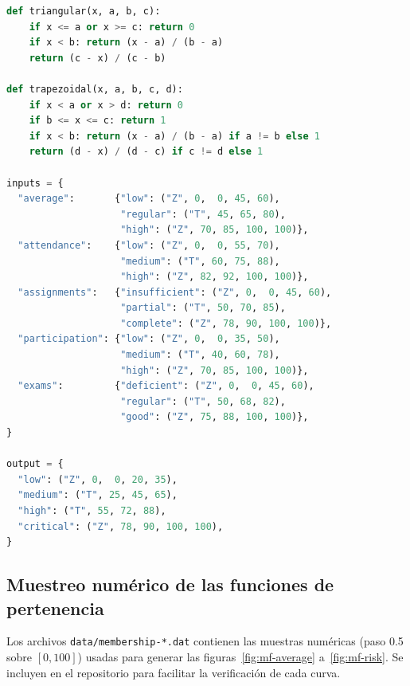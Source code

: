 \begin{lstlisting}[caption={Definicion equivalente del sistema en pseudo-Python},language=Python]
def triangular(x, a, b, c):
    if x <= a or x >= c: return 0
    if x < b: return (x - a) / (b - a)
    return (c - x) / (c - b)

def trapezoidal(x, a, b, c, d):
    if x < a or x > d: return 0
    if b <= x <= c: return 1
    if x < b: return (x - a) / (b - a) if a != b else 1
    return (d - x) / (d - c) if c != d else 1

inputs = {
  "average":       {"low": ("Z", 0,  0, 45, 60),
                    "regular": ("T", 45, 65, 80),
                    "high": ("Z", 70, 85, 100, 100)},
  "attendance":    {"low": ("Z", 0,  0, 55, 70),
                    "medium": ("T", 60, 75, 88),
                    "high": ("Z", 82, 92, 100, 100)},
  "assignments":   {"insufficient": ("Z", 0,  0, 45, 60),
                    "partial": ("T", 50, 70, 85),
                    "complete": ("Z", 78, 90, 100, 100)},
  "participation": {"low": ("Z", 0,  0, 35, 50),
                    "medium": ("T", 40, 60, 78),
                    "high": ("Z", 70, 85, 100, 100)},
  "exams":         {"deficient": ("Z", 0,  0, 45, 60),
                    "regular": ("T", 50, 68, 82),
                    "good": ("Z", 75, 88, 100, 100)},
}

output = {
  "low": ("Z", 0,  0, 20, 35),
  "medium": ("T", 25, 45, 65),
  "high": ("T", 55, 72, 88),
  "critical": ("Z", 78, 90, 100, 100),
}
\end{lstlisting}

\subsection{Muestreo numérico de las funciones de pertenencia}

Los archivos \texttt{data/membership-*.dat} contienen las muestras numéricas (paso 0.5 sobre $[0,100]$) usadas para generar las figuras~\ref{fig:mf-average} a~\ref{fig:mf-risk}. Se incluyen en el repositorio para facilitar la verificación de cada curva.
